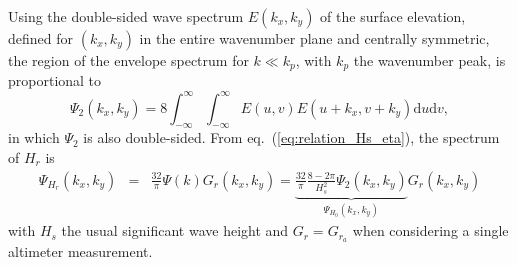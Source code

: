 {Using the double-sided wave spectrum $E(k_x,k_y)$ of the surface elevation, defined for $(k_x,k_y)$ in the entire wavenumber plane and centrally symmetric, the region of the envelope spectrum for $k \ll k_p$, with $k_p$ the wavenumber peak, is 
proportional to
\begin{equation}
    \Psi_{2}(k_x,k_y) = 8 \int_{-\infty}^\infty 
    \int_{-\infty}^\infty
E(u,v)E(u+k_x,v+k_y)\mathrm{d}u \mathrm{d}v,
\end{equation}
in which $\Psi_{2}$ is also double-sided. From  eq.~(\ref{eq:relation_Hs_eta}), the spectrum of $H_r$ is
\begin{eqnarray}
\Psi_{H_r}(k_x,k_y) &= & \frac{32}{\pi}  \Psi(k)  G_{r}(k_x,k_y) =  \underbrace{\frac{32}{\pi} \frac{8 - 2\pi}{H_s^2}   \Psi_2(k_x,k_y)}_{\Psi_{H_0}(k_x,k_y)}  G_{r}(k_x,k_y)\label{eq:eq2_inFourier}
\end{eqnarray}
with $H_s$ the usual significant wave height and $G_{r}=G_{r_a}$ when considering a single altimeter measurement.

}
